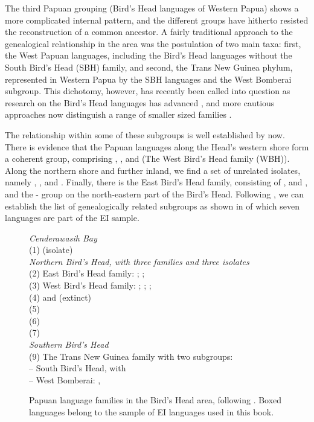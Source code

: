 The third Papuan grouping (Bird's Head languages of Western Papua) shows a more complicated internal pattern, and the different groups have hitherto resisted the reconstruction of a common ancestor. A fairly traditional approach to the genealogical relationship in the area was the postulation of two main taxa: first, the West Papuan languages, including the Bird's Head languages without the South Bird's Head (SBH) family, and second, the Trans New Guinea phylum, represented in Western Papua by the SBH languages and the West Bomberai subgroup. This dichotomy, however, has recently been called into question as research on the Bird's Head languages has advanced \citep{dol2007grammar}, and more cautious approaches now distinguish a range of smaller sized families \citep{reesink2005west}.

The relationship within some of these subgroups is well established by now. There is evidence that the Papuan languages along the Head's western shore form a coherent group, comprising , ,  and  (The West Bird's Head family (WBH)). Along the northern shore and further inland, we find a set of unrelated isolates, namely , , and . Finally, there is the East Bird's Head family, consisting of ,  and , and the - group on the north-eastern part of the Bird's Head. Following \citet{klamer2008east}, we can establish the list of genealogically related subgroups as shown in  of which seven languages are part of the EI sample.


\begin{figure}[ht]
{\raggedright%
\begin{footnotesize}
\textit{Cenderawasih Bay} \\
(1)  (isolate) \bigskip\\
\textit{Northern Bird’s Head, with three families and three isolates} \\
(2) East Bird’s Head family: ; ;  \\
(3) West Bird’s Head family: ; ; ;  \\
(4)  and (extinct)  \\
(5)  \\
(6)  \\
(7)  \bigskip\\
\textit{Southern Bird’s Head} \\
(9) The Trans New Guinea family with two subgroups: \\
– South Bird’s Head, with  \\
– West Bomberai: ,  \\
\end{footnotesize}}
\caption[The Papuan languages of the Bird's Head]{Papuan language families in the Bird's Head area, following \citet{klamer2008east}. Boxed languages belong to the sample of EI languages used in this book.}\label{fig:westpapuan}
\end{figure}

